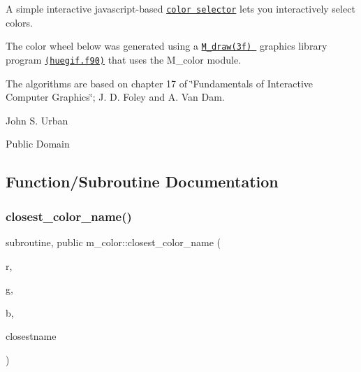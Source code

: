 \begin{DoxyDescription}
A simple interactive javascript-\/based \href{../../../public_html/javascript/color/iframe.html}{\tt color selector} lets you interactively select colors. 





The color wheel below was generated using a \href{BOOK_M_draw.html}{\tt M\+\_\+draw(3f) } graphics library program \href{../test/demos/huegif.f90}{\tt (huegif.\+f90)} that uses the M\+\_\+color module. 



\begin{center}  \end{center} 




\item[R\+E\+F\+E\+R\+E\+N\+C\+ES]The algorithms are based on chapter 17 of \char`\"{}\+Fundamentals of Interactive Computer Graphics\char`\"{}; J. D. Foley and A. Van Dam. 


\item[A\+U\+T\+H\+OR ]

John S. Urban




\item[L\+I\+C\+E\+N\+SE ]

Public Domain




\end{DoxyDescription}

\subsection{Function/\+Subroutine Documentation}
\mbox{\label{namespacem__color_acad72628ee0b77cf87f40cd46734fb18}} 
\subsubsection{\texorpdfstring{closest\+\_\+color\+\_\+name()}{closest\_color\_name()}}
{\footnotesize\ttfamily subroutine, public m\+\_\+color\+::closest\+\_\+color\+\_\+name (\begin{DoxyParamCaption}\item[{real, intent(in)}]{r,  }\item[{real, intent(in)}]{g,  }\item[{real, intent(in)}]{b,  }\item[{character(len=$\ast$), intent(out)}]{closestname }\end{DoxyParamCaption})}



